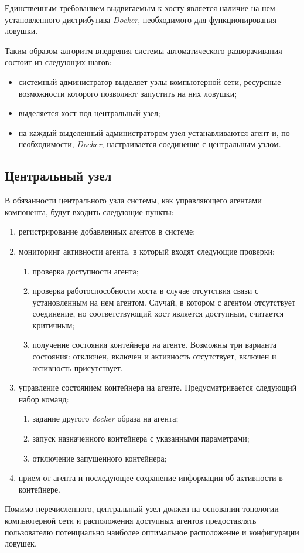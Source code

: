 Единственным требованием выдвигаемым к хосту является наличие на нем установленного дистрибутива \textit{Docker}, необходимого для функционирования ловушки.

Таким образом алгоритм внедрения системы автоматического разворачивания состоит из следующих шагов:

\begin{itemize}
	\item системный администратор выделяет узлы компьютерной сети, ресурсные возможности которого позволяют запустить на них ловушки;
	\item выделяется хост под центральный узел;
	\item на каждый выделенный администратором узел устанавливаются агент и, по необходимости, \textit{Docker}, настраивается соединение с центральным узлом.
\end{itemize}


\subsection{Центральный узел}

В обязанности центрального узла системы, как управляющего агентами компонента, будут входить следующие пункты:

\begin{enumerate}
	\item регистрирование добавленных агентов в системе;
	\item мониторинг активности агента, в который входят следующие проверки:
		\begin{enumerate}
			\item проверка доступности агента;
			\item проверка работоспособности хоста в случае отсутствия связи с установленным на нем агентом. Случай, в котором с агентом отсутствует соединение, но соответствующий хост является доступным, считается критичным;
			\item получение состояния контейнера на агенте. Возможны три варианта состояния: отключен, включен и активность отсутствует, включен и активность присутствует.	
		\end{enumerate}
	\item управление состоянием контейнера на агенте. Предусматривается следующий набор команд:
		\begin{enumerate}
			\item задание другого \textit{docker} образа на агента;
			\item запуск назначенного контейнера с указанными параметрами;
			\item отключение запущенного контейнера;
		\end{enumerate}
	\item прием от агента и последующее сохранение информации об активности в контейнере.
\end{enumerate}

Помимо перечисленного, центральный узел должен на основании топологии компьютерной сети и расположения доступных агентов предоставлять пользователю потенциально наиболее оптимальное расположение и конфигурации ловушек.